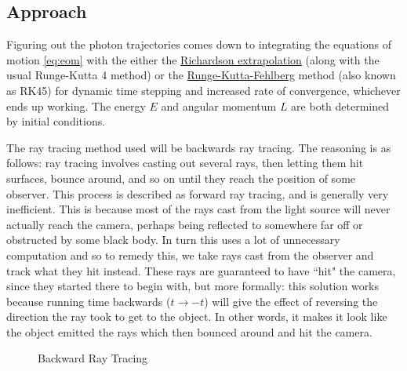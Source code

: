 \documentclass{article}
\begin{document}
\subsection*{Approach}
Figuring out the photon trajectories comes down to integrating the equations of motion \ref{eq:eom} with the either the \hyperlink{https://personal.math.ubc.ca/~feldman/m256/richard.pdf}{Richardson extrapolation} (along with the usual Runge-Kutta 4 method) or the \hyperlink{https://en.wikipedia.org/wiki/Runge-Kutta-Fehlberg_method}{Runge-Kutta-Fehlberg} method (also known as RK45) for dynamic time stepping and increased rate of convergence, whichever ends up working. The energy \(E\) and angular momentum \(L\) are both determined by initial conditions. 

The ray tracing method used will be backwards ray tracing. The reasoning is as follows: ray tracing involves casting out several rays, then letting them hit surfaces, bounce around, and so on until they reach the position of some observer. This process is described as forward ray tracing, and is generally very inefficient. This is because most of the rays cast from the light source will never actually reach the camera, perhaps being reflected to somewhere far off or obstructed by some black body. In turn this uses a lot of unnecessary computation and so to remedy this, we take rays cast from the observer and track what they hit instead. These rays are guaranteed to have ``hit" the camera, since they started there to begin with, but more formally: this solution works because running time backwards (\(t\to -t\)) will give the effect of reversing the direction the ray took to get to the object. In other words, it makes it look like the object emitted the rays which then bounced around and hit the camera.

\begin{figure}[H]
	\centering
	\caption{Backward Ray Tracing}
\end{figure}
\end{document}
